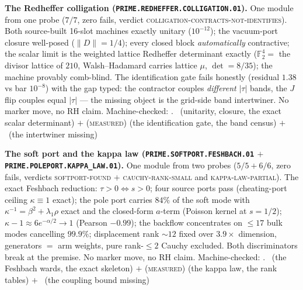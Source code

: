 \par\smallskip\noindent\textbf{The Redheffer colligation
(\texttt{PRIME.REDHEFFER.\allowbreak COLLIGATION.01}).}
One module from one probe ($7/7$, zero fails, verdict
\textsc{colligation-contracts-not-identifies}).  Both
source-built 16-slot machines exactly unitary ($10^{-12}$); the
vacuum-port closure well-posed ($\|D\| = 1/4$); every closed
block \emph{automatically} contractive; the scalar limit is the
weighted lattice Redheffer determinant exactly
($\mathbb{F}_2^4 = $ the divisor lattice of $210$,
Walsh--Hadamard carries lattice $\mu$, $\det = 8/35$); the
machine provably comb-blind.  The identification gate fails
honestly (residual $1.38$ vs bar $10^{-8}$) with the gap typed:
the contractor couples \emph{different} $|\tau|$ bands, the $J$
flip couples equal $|\tau|$ --- the missing object is the
grid-side band intertwiner.  No marker move, no RH claim.
Machine-checked: .
\mE\ (unitarity, closure, the exact scalar determinant) $+$
(\textsc{measured}) (the identification gate, the band census)
$+$ \mO\ (the intertwiner missing)
\par\smallskip


\par\smallskip\noindent\textbf{The soft port and the kappa law
(\texttt{PRIME.SOFTPORT.\allowbreak FESHBACH.01} $+$
\texttt{PRIME.POLEPORT.\allowbreak KAPPA\_LAW.01}).}
One module from two probes ($5/5 + 6/6$, zero fails, verdicts
\textsc{softport-found} $+$ \textsc{cauchy-rank-small} and
\textsc{kappa-law-partial}).  The exact Feshbach reduction:
$\tau > 0 \Leftrightarrow s > 0$; four source ports pass
(cheating-port ceiling $\kappa \equiv 1$ exact); the pole port
carries $84\%$ of the soft mode with $\kappa^{-1} = \beta^2 +
\lambda_1\rho$ exact and the closed-form $a$-term (Poisson
kernel at $s = 1/2$); $\kappa - 1 \approx 6e^{-\alpha/2} \to 1$
(Pearson $-0.99$); the backflow concentrates on $\le 17$ bulk
modes cancelling $99.9\%$; displacement rank ${\sim}12$ fixed
over $3.9\times$ dimension, generators $=$ arm weights, pure
rank-$\le2$ Cauchy excluded.  Both discriminators break at the
premise.  No marker move, no RH claim.
Machine-checked: .
\mE\ (the Feshbach wards, the exact skeleton) $+$
(\textsc{measured}) (the kappa law, the rank tables) $+$ \mO\
(the coupling bound missing)
\par\smallskip



